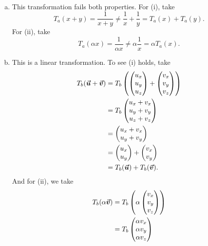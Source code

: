 \documentclass[12pt]{article} %
\begin{document}
\begin{solution}~
\begin{enumerate}[(a)]
    \item This transformation fails both properties.  For (i), take
    \[
    T_a(x+y) = \frac{1}{x+y} \neq \frac{1}{x}+\frac{1}{y} = T_a(x)+T_a(y).
    \]
    For (ii), take
    \[
    T_a(\alpha x) = \frac{1}{\alpha x} \neq \alpha \frac{1}{x} = \alpha T_a(x).
    \]
    \item This is a linear transformation.  To see (i) holds, take
    \begin{align*}
        T_b(\boldsymbol{\vec{u}} +\boldsymbol{\vec{v}})&= T_b \left( \begin{pmatrix} u_x \\ u_y \\ u_z \end{pmatrix} + \begin{pmatrix} v_x \\ v_y \\ v_z \end{pmatrix} \right)\\
        &=T_b \begin{pmatrix} u_x + v_x \\ u_y + v_y \\ u_z + v_z \end{pmatrix}\\
        &= \begin{pmatrix} u_x + v_x \\ u_y + v_y \end{pmatrix}\\
        &= \begin{pmatrix} u_x \\ u_y \end{pmatrix} + \begin{pmatrix} v_x \\ v_y \end{pmatrix}\\
        &= T_b(\boldsymbol{\vec{u}}) + T_b(\boldsymbol{\vec{v}}).
    \end{align*}
    And for (ii), we take
    \begin{align*}
        T_b(\alpha \vecv) &= T_b \left( \alpha \begin{pmatrix} v_x \\ v_y \\ v_z \end{pmatrix}\right)\\
        &= T_b \begin{pmatrix} \alpha v_x \\ \alpha v_y \\ \alpha v_z \end{pmatrix}\\

\end{align*}
\end{enumerate}
\end{solution}
\end{document}
